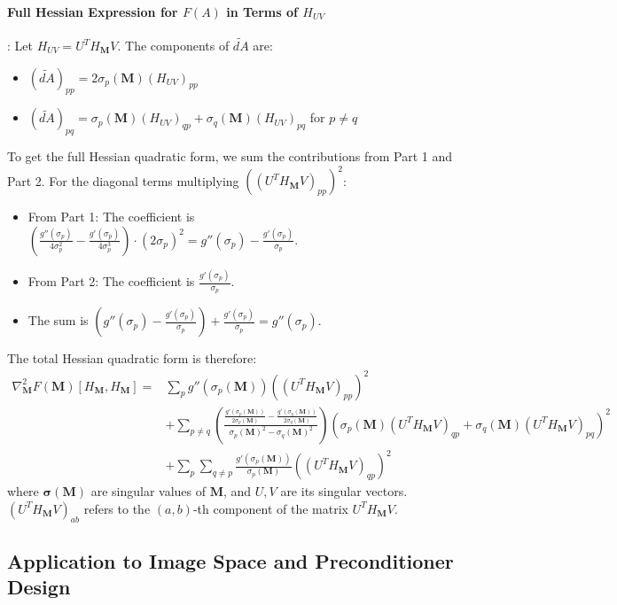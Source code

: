 \paragraph{Full Hessian Expression for $F(A)$ in Terms of $H_{UV}$}:
Let $H_{UV} = U^T H_{\mathbf{M}} V$. The components of $\widetilde{dA}$ are:
\begin{itemize}
    \item $(\widetilde{dA})_{pp} = 2 \sigma_p(\mathbf{M}) (H_{UV})_{pp}$
    \item $(\widetilde{dA})_{pq} = \sigma_p(\mathbf{M}) (H_{UV})_{qp} + \sigma_q(\mathbf{M}) (H_{UV})_{pq}$ for $p \neq q$
\end{itemize}
To get the full Hessian quadratic form, we sum the contributions from Part 1 and Part 2.
For the diagonal terms multiplying $((U^T H_{\mathbf{M}} V)_{pp})^2$:
\begin{itemize}
    \item From Part 1: The coefficient is $\left(\frac{g''(\sigma_p)}{4\sigma_p^2} - \frac{g'(\sigma_p)}{4\sigma_p^3}\right) \cdot (2\sigma_p)^2 = g''(\sigma_p) - \frac{g'(\sigma_p)}{\sigma_p}$.
    \item From Part 2: The coefficient is $\frac{g'(\sigma_p)}{\sigma_p}$.
    \item The sum is $\left(g''(\sigma_p) - \frac{g'(\sigma_p)}{\sigma_p}\right) + \frac{g'(\sigma_p)}{\sigma_p} = g''(\sigma_p)$.
\end{itemize}
The total Hessian quadratic form is therefore:
\begin{align*}
\nabla_{\mathbf{M}}^2 F(\mathbf{M})[H_{\mathbf{M}},H_{\mathbf{M}}] = & \sum_p g''(\sigma_p(\mathbf{M})) ((U^T H_{\mathbf{M}} V)_{pp})^2 \\
& + \sum_{p \neq q} \left(\frac{\frac{g'(\sigma_p(\mathbf{M}))}{2\sigma_p(\mathbf{M})} - \frac{g'(\sigma_q(\mathbf{M}))}{2\sigma_q(\mathbf{M})}}{\sigma_p(\mathbf{M})^2 - \sigma_q(\mathbf{M})^2}\right) (\sigma_p(\mathbf{M}) (U^T H_{\mathbf{M}} V)_{qp} + \sigma_q(\mathbf{M}) (U^T H_{\mathbf{M}} V)_{pq})^2 \\
& + \sum_p \sum_{q \neq p} \frac{g'(\sigma_p(\mathbf{M}))}{\sigma_p(\mathbf{M})} ((U^T H_{\mathbf{M}} V)_{qp})^2
\end{align*}
where $\boldsymbol{\sigma}(\mathbf{M})$ are singular values of $\mathbf{M}$, and $U, V$ are its singular vectors. $(U^T H_{\mathbf{M}} V)_{ab}$ refers to the $(a,b)$-th component of the matrix $U^T H_{\mathbf{M}} V$.

\subsection{Application to Image Space and Preconditioner Design}

